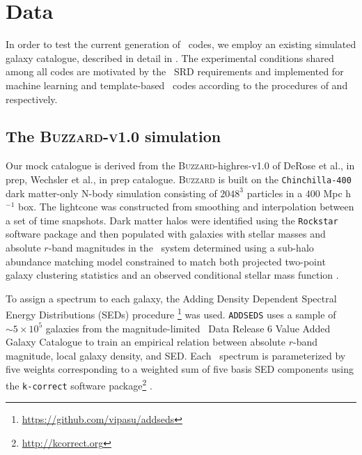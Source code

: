 \section{Data}

In order to test the current generation of \pzpdf\ codes, we employ an existing simulated galaxy catalogue, described in detail in .
The experimental conditions shared among all codes are motivated by the \lsst\ SRD requirements and implemented for machine learning and template-based \pzpdf\ codes according to the procedures of  and  respectively.

\subsection{The \textsc{Buzzard-v1.0} simulation}

Our mock catalogue is derived from the \textsc{Buzzard}-highres-v1.0  of DeRose et al., in prep, Wechsler et al., in prep catalogue.
\textsc{Buzzard} is built on the \texttt{Chinchilla-400} \citep{mao_dependence_2015} dark matter-only N-body simulation consisting of $2048^{3}$ particles in a $400$ Mpc h$^{-1}$ box.
The lightcone was constructed from smoothing and interpolation between a set of time snapshots.
Dark matter halos were identified using the \texttt{Rockstar} software package \citep{behroozi_rockstar_2013} and then populated with galaxies with stellar masses and absolute $r$-band magnitudes in the \sdss\ system determined using a sub-halo abundance matching model constrained to match both projected two-point galaxy clustering statistics and an observed conditional stellar mass function \citep{reddick_connection_2013}.

To assign a spectrum to each galaxy, the Adding Density Dependent Spectral Energy Distributions (SEDs) procedure \citep[\texttt{ADDSEDS,}][Wechsler et al., in prep,]{derose_buzzard_2019}\footnote{\url{https://github.com/vipasu/addseds}} was used.
\texttt{ADDSEDS} uses a sample of $\sim 5\times 10^{5}$ galaxies from the magnitude-limited \sdss\ Data Release 6 Value Added Galaxy Catalogue \citep[NYU-VAGC,][]{blanton_new_2005} to train an empirical relation between absolute $r$-band magnitude, local galaxy density, and SED.
Each \sdss\ spectrum is parameterized by five weights corresponding to a weighted sum of five basis SED components using the \texttt{k-correct} software package\footnote{\url{http://kcorrect.org}} \citep{blanton_k-corrections_2007}.


